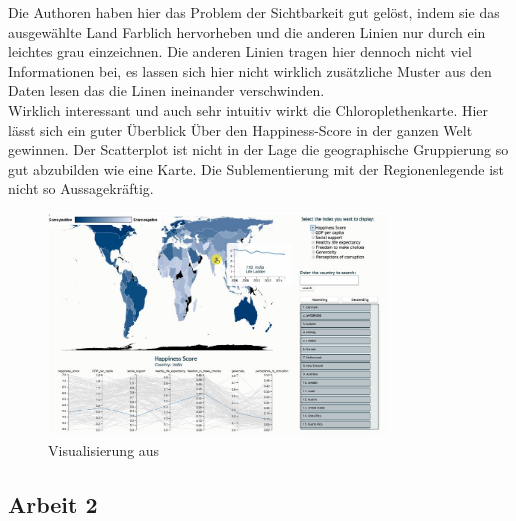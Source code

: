 Die Authoren haben hier das Problem der Sichtbarkeit gut gelöst, indem sie das ausgewählte Land Farblich hervorheben und die anderen Linien nur durch ein leichtes grau einzeichnen. Die anderen Linien tragen hier dennoch nicht viel Informationen bei, es lassen sich hier nicht wirklich zusätzliche Muster aus den Daten lesen das die Linen ineinander verschwinden.\\

Wirklich interessant und auch sehr intuitiv wirkt die Chloroplethenkarte. Hier lässt sich ein guter Überblick Über den Happiness-Score in der ganzen Welt gewinnen. Der Scatterplot ist nicht in der Lage die geographische Gruppierung so gut abzubilden wie eine Karte. Die Sublementierung mit der Regionenlegende ist nicht so Aussagekräftig. 

\cite{bazurto2019}
\begin{figure}[h]
 \centering
 \includegraphics[width = 0.8\textwidth]{img/bazurto_vis.jpg}
 \caption{Visualisierung aus \textcite{bazurto2019}}
 \label{fig:bazurto}
\end{figure}

\subsection{Arbeit 2}